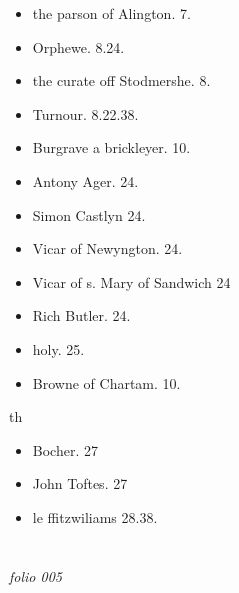 \documentclass[12pt, a4paper]{book}
\begin{document}
				\begin{itemize}
					\item[]the parson of Alington. 7.
					\item[]Orphewe. 8.24.
					\item[]the curate off Stodmershe. 8.
					\item[]Turnour. 8.22.38.
					\item[]Burgrave a brickleyer. 10.
				\end{itemize}
				\begin{itemize}
					\item[]Antony Ager. 24.
					\item[]Simon Castlyn 24.
					\item[]Vicar of Newyngton. 24.
					\item[]Vicar of s. Mary of Sandwich 24
					\item[]Rich Butler. 24.
					\item[]holy. 25.
				\end{itemize}
			
            		
            			
				\marginpar[\vspace{0.5cm}{\textcolor{Gray}{n}}]{}
			
            			\begin{itemize}
            				\item[]Browne of Chartam. 10.
            			\end{itemize}
            			th
            			\begin{itemize}
            				\item[]Bocher. 27
            				\item[]John Toftes. 27
            				\item[]le ffitzwiliams 28.38.
            			\end{itemize}
            		

            	
\dotfill
					  \section*{}  \subsection*{}

\textit{folio 005}
			
\end{document}
